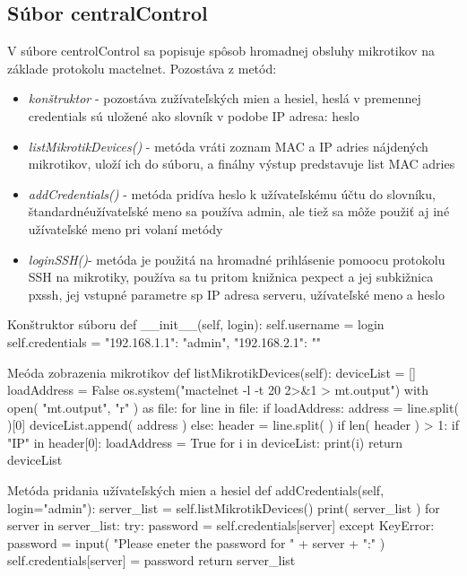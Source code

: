 \subsection{Súbor centralControl}
\label{sec:central}
V súbore centrolControl sa popisuje spôsob hromadnej obsluhy mikrotikov na základe protokolu mactelnet. Pozostáva z metód:
\begin{itemize}
\item \textit{konštruktor} - pozostáva zužívateľských mien a hesiel, heslá v premennej credentials sú uložené ako slovník v podobe IP adresa: heslo
\item \textit{listMikrotikDevices()} - metóda vráti zoznam MAC a IP adries nájdených mikrotikov, uloží ich do súboru, a finálny výstup predstavuje list MAC adries
\item \textit{addCredentials()} - metóda pridíva heslo k užívateľskému účtu do slovníku, štandardnéužívateľské meno sa používa admin, ale tiež sa môže použiť aj iné užívateľské meno pri volaní metódy
\item \textit{loginSSH()}- metóda je použitá na hromadné prihlásenie pomoocu protokolu SSH na mikrotiky, používa sa tu pritom knižnica pexpect a jej subkižnica pxssh, jej vstupné parametre sp IP adresa serveru, užívateľské meno a heslo 
\end{itemize}
\begin{sexylisting}{Konštruktor súboru}
 def __init__(self, login):
        self.username = login
        self.credentials = {
            "192.168.1.1": "admin",
            "192.168.2.1": ""
        }
\end{sexylisting}
\begin{sexylisting}{Meóda zobrazenia mikrotikov}
 def listMikrotikDevices(self):
   deviceList = []
   loadAddress = False
   os.system("mactelnet -l -t 20 2>&1 > mt.output")
    with open( "mt.output", "r" ) as file:
     for line in file:
      if loadAddress:
         address = line.split( )[0]
         deviceList.append( address )
      else:
         header = line.split( )
         if len( header ) > 1:
            if "IP" in header[0]:
              loadAddress = True
         for i in deviceList:
           print(i)
  return deviceList
\end{sexylisting}
\begin{sexylisting}{Metóda pridania užívateľských mien a hesiel}
 def addCredentials(self, login="admin"):
   server_list = self.listMikrotikDevices()
   print( server_list )
   for server in server_list:
   try:
    password = self.credentials[server]
    except KeyError:
    password = input( "Please eneter the 
    password for " + server + ":" )
    self.credentials[server] = password
    return server_list
\end{sexylisting}
